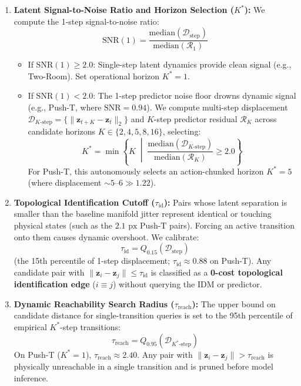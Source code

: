 \documentclass[11pt]{article}
\newcommand{\zv}{\mathbf{z}}
\begin{document}
\begin{enumerate}[leftmargin=1.4em,itemsep=3pt]
\item \textbf{Latent Signal-to-Noise Ratio and Horizon Selection ($K^*$):}
We compute the 1-step signal-to-noise ratio:
\begin{equation}
\mathrm{SNR}(1) = \frac{\mathrm{median}(\mathcal{D}_{\text{step}})}{\mathrm{median}(\mathcal{R}_1)}
\end{equation}
\begin{itemize}[leftmargin=1.2em,itemsep=1pt]
\item If $\mathrm{SNR}(1) \ge 2.0$: Single-step latent dynamics provide clean signal (e.g., Two-Room). Set operational horizon $K^* = 1$.
\item If $\mathrm{SNR}(1) < 2.0$: The 1-step predictor noise floor drowns dynamic signal (e.g., Push-T, where $\mathrm{SNR}=0.94$).
We compute multi-step displacement $\mathcal{D}_{K\text{-step}} = \{\|\zv_{t+K} - \zv_t\|_2\}$ and $K$-step predictor residual
$\mathcal{R}_K$ across candidate horizons $K \in \{2, 4, 5, 8, 16\}$, selecting:
\begin{equation}
K^* = \min \left\{ K \;\middle|\; \frac{\mathrm{median}(\mathcal{D}_{K\text{-step}})}{\mathrm{median}(\mathcal{R}_K)} \ge 2.0 \right\}
\end{equation}
For Push-T, this autonomously selects an action-chunked horizon $K^* = 5$ (where displacement $\sim 5\text{--}6 \gg 1.22$).
\end{itemize}

\item \textbf{Topological Identification Cutoff ($\tau_{\mathrm{id}}$):}
Pairs whose latent separation is smaller than the baseline manifold jitter represent identical or touching physical states
(such as the $2.1\text{ px}$ Push-T pairs). Forcing an active transition onto them causes dynamic overshoot. We calibrate:
\begin{equation}
\tau_{\mathrm{id}} = Q_{0.15}(\mathcal{D}_{\text{step}})
\end{equation}
(the 15th percentile of 1-step displacement; $\tau_{\mathrm{id}} \approx 0.88$ on Push-T). Any candidate pair with
$\|\zv_i - \zv_j\| \le \tau_{\mathrm{id}}$ is classified as a \textbf{0-cost topological identification edge} ($i \equiv j$)
without querying the IDM or predictor.

\item \textbf{Dynamic Reachability Search Radius ($\tau_{\mathrm{reach}}$):}
The upper bound on candidate distance for single-transition queries is set to the 95th percentile of empirical $K^*$-step transitions:
\begin{equation}
\tau_{\mathrm{reach}} = Q_{0.95}(\mathcal{D}_{K^*\text{-step}})
\end{equation}
On Push-T ($K^*=1$), $\tau_{\mathrm{reach}} \approx 2.40$. Any pair with $\|\zv_i - \zv_j\| > \tau_{\mathrm{reach}}$ is physically
unreachable in a single transition and is pruned before model inference.


\end{enumerate}
\end{document}
